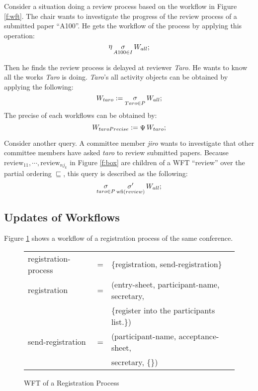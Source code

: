 Consider a situation doing a review process based on the workflow in
Figure \ref{f:wft}.  The chair wants to investigate the progress of the
review process of a submitted paper ``A100''.  He gets the workflow
of the process by applying this operation:
\[
 \mathop{\eta} \mathop{\sigma}_{A100 \in I} W_{all};
\]

Then he finds the review process is delayed at reviewer {\it Taro}.  He
wants to know all the works {\it Taro} is doing.  {\it Taro}'s all
activity objects can be obtained by applying the following:
\[
 W_{taro} := \mathop{\sigma}_{Taro \in P} W_{all};
\]
The precise of each workflows can be obtained by:
\[
 W_{taroPrecise} := \mathop{\Psi} W_{taro};
\]

Consider another query.  A committee member {\it jiro} wants to
investigate that other committee members have asked {\it taro} to review
submitted papers.  Because $\mbox{review}_{11}, \cdots,
\mbox{review}_{nj_k}$ in Figure \ref{f:box} are children of a WFT ``review''
over the partial ordering $\sqsubseteq$, this query is described as the
following:
\[
 \mathop{\sigma}_{taro \in P} \mathop{\sigma'}_{\mathop{\rm wfi}\nolimits(review)} W_{all};
\]

\subsection{Updates of Workflows}

Figure \ref{fig:registration} shows a workflow of a registration process of 
the same conference.
\begin{figure}
\begin{center}
\begin{tabular}{lcl}
 registration-process & = & \{registration, send-registration\}\\
 registration & = & (entry-sheet, participant-name, secretary, \\
              &   & \{register into the participants list.\})\\
 send-registration & = & (participant-name, acceptance-sheet, \\
                   &   & secretary, \{\})
\end{tabular}
\end{center}
\caption{WFT of a Registration Process}
\label{fig:registration}
\end{figure}

